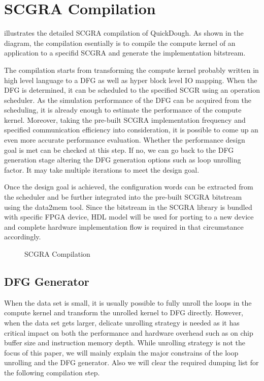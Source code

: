 \section{SCGRA Compilation} \label{sec:scgracompile}
 illustrates the detailed SCGRA compilation of QuickDough. As shown in the diagram, the compilation esentially is to compile the compute kernel of an application to a specifid SCGRA and generate the implementation bitstream. 

The compilation starts from transforming the compute kernel probably written in high level language to a DFG as well as hyper block level IO mapping. When the DFG is determined, it can be scheduled to the specified SCGR using an operation scheduler. As the simulation performance of the DFG can be acquired from the scheduling, it is already enough to estimate the performance of the compute kernel. Moreover, taking the pre-built SCGRA implementation frequency and specified communication efficiency into consideration, it is possible to come up an even more accurate performance evaluation. Whether the performance design goal is met can be checked at this step. If no, we can go back to the DFG generation stage altering the DFG generation options such as loop unrolling factor. It may take multiple iterations to meet the design goal. 

Once the design goal is achieved, the configuration words can be extracted from the scheduler and be further integrated into the pre-built SCGRA bitstream using the data2mem tool. Since the bitstream in the SCGRA library is bundled with specific FPGA device, HDL model will be used for porting to a new device and complete hardware implementation flow is required in that circumstance accordingly.
 
\begin{figure}[H]
\caption{SCGRA Compilation}
\label{fig:scgra-compile}
\end{figure}

\subsection{DFG Generator}
When the data set is small, it is usually possible to fully unroll the loops in the compute kernel and transform the unrolled kernel to DFG directly. However, when the data set gets larger, delicate unrolling strategy is needed as it has critical impact on both the performance and hardware overhead such as on chip buffer size and instruction memory depth. While unrolling strategy is not the focus of this paper, we will mainly explain the major constrains of the loop unrolling and the DFG generator. Also we will clear the required dumping list for the following compilation step.

